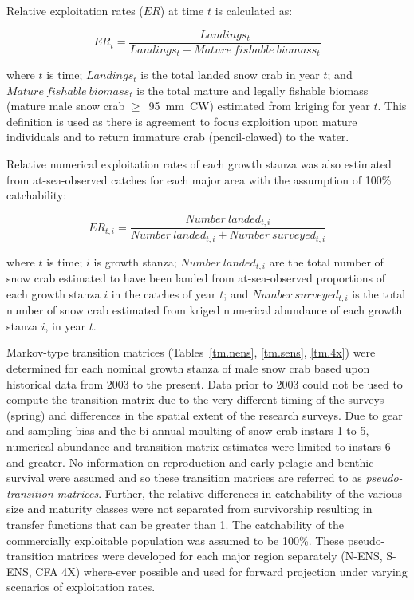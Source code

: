 \documentclass[11pt]{article}
\begin{document}
Relative exploitation rates ($ER$) at time $t$ is calculated as:

\begin{equation}
  ER_{t} = \dfrac { Landings_{t} } {  Landings_{t} + Mature \: fishable \: biomass_{t}  }
\end{equation}

where $t$ is time; $Landings_{t}$ is the total landed snow crab in year $t$; and $Mature \: fishable \: biomass_{t}$ is the total mature and legally fishable biomass (mature male snow crab $\geq$~95~mm~CW) estimated from kriging for year $t$. This definition is used as there is agreement to focus exploition upon mature individuals and to return immature crab (pencil-clawed) to the water. 

Relative numerical exploitation rates of each growth stanza was also estimated from at-sea-observed catches for each major area with the assumption of 100\% catchability:

\begin{equation}
  ER_{t,i} = \dfrac{ Number \: landed_{t,i} } {  Number \: landed_{t,i} + Number \: surveyed_{t,i}  }
\end{equation}

where $t$ is time; $i$ is growth stanza; $Number \: landed_{t,i}$ are the total number of snow crab estimated to have been landed from at-sea-observed proportions of each growth stanza $i$ in the catches of year $t$; and $Number \: surveyed_{t,i}$ is the total number of snow crab estimated from kriged numerical abundance of each growth stanza $i$, in year $t$.

Markov-type transition matrices (Tables~\ref{tm.nens}, \ref{tm.sens}, \ref{tm.4x}) were determined for each nominal growth stanza of male snow crab based upon historical data from 2003 to the present. Data prior to 2003 could not be used to compute the transition matrix due to the very different timing of the surveys (spring) and differences in the spatial extent of the research surveys. Due to gear and sampling bias and the bi-annual moulting of snow crab instars 1 to 5, numerical abundance and transition matrix estimates were limited to instars 6 and greater. No information on reproduction and early pelagic and benthic survival were assumed and so these transition matrices are referred to as \emph{pseudo-transition matrices}. Further, the relative differences in catchability of the various size and maturity classes were not separated from survivorship resulting in transfer functions that can be greater than 1. The catchability of the commercially exploitable population was assumed to be 100\%. These pseudo-transition matrices were developed for each major region separately (N-ENS, S-ENS, CFA 4X) where-ever possible and used for forward projection under varying scenarios of exploitation rates.
\end{document}

